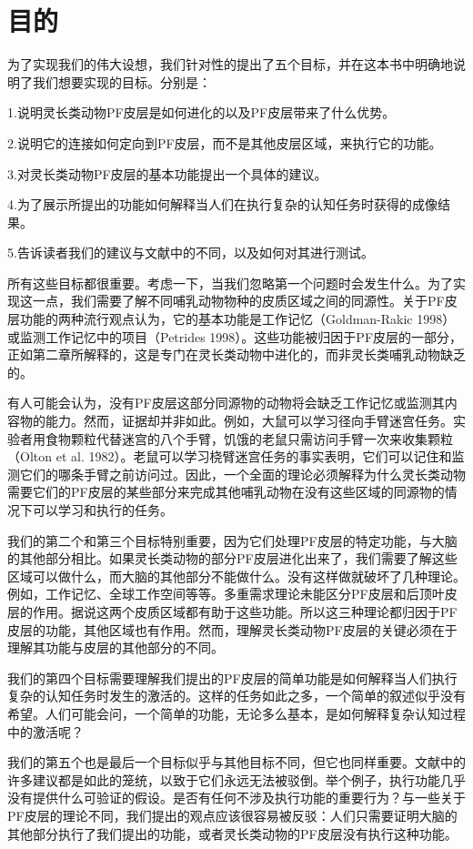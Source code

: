 \section{目的}
为了实现我们的伟大设想，我们针对性的提出了五个目标，并在这本书中明确地说明了我们想要实现的目标。分别是：
\par 
  1.说明灵长类动物PF皮层是如何进化的以及PF皮层带来了什么优势。 
\par 2.说明它的连接如何定向到PF皮层，而不是其他皮层区域，来执行它的功能。 
\par 3.对灵长类动物PF皮层的基本功能提出一个具体的建议。
\par 4.为了展示所提出的功能如何解释当人们在执行复杂的认知任务时获得的成像结果。
\par  5.告诉读者我们的建议与文献中的不同，以及如何对其进行测试。
\par 
所有这些目标都很重要。考虑一下，当我们忽略第一个问题时会发生什么。为了实现这一点，我们需要了解不同哺乳动物物种的皮质区域之间的同源性。关于PF皮层功能的两种流行观点认为，它的基本功能是工作记忆（Goldman-Rakic 1998）或监测工作记忆中的项目（Petrides 1998）。这些功能被归因于PF皮层的一部分，正如第二章所解释的，这是专门在灵长类动物中进化的，而非灵长类哺乳动物缺乏的。
\par 
有人可能会认为，没有PF皮层这部分同源物的动物将会缺乏工作记忆或监测其内容物的能力。然而，证据却并非如此。例如，大鼠可以学习径向手臂迷宫任务。实验者用食物颗粒代替迷宫的八个手臂，饥饿的老鼠只需访问手臂一次来收集颗粒（Olton et al. 1982）。老鼠可以学习桡臂迷宫任务的事实表明，它们可以记住和监测它们的哪条手臂之前访问过。因此，一个全面的理论必须解释为什么灵长类动物需要它们的PF皮层的某些部分来完成其他哺乳动物在没有这些区域的同源物的情况下可以学习和执行的任务。
\par
我们的第二个和第三个目标特别重要，因为它们处理PF皮层的特定功能，与大脑的其他部分相比。如果灵长类动物的部分PF皮层进化出来了，我们需要了解这些区域可以做什么，而大脑的其他部分不能做什么。没有这样做就破坏了几种理论。例如，工作记忆、全球工作空间等等。多重需求理论未能区分PF皮层和后顶叶皮层的作用。据说这两个皮质区域都有助于这些功能。所以这三种理论都归因于PF皮层的功能，其他区域也有作用。然而，理解灵长类动物PF皮层的关键必须在于理解其功能与皮层的其他部分的不同。
\par
我们的第四个目标需要理解我们提出的PF皮层的简单功能是如何解释当人们执行复杂的认知任务时发生的激活的。这样的任务如此之多，一个简单的叙述似乎没有希望。人们可能会问，一个简单的功能，无论多么基本，是如何解释复杂认知过程中的激活呢？
\par
我们的第五个也是最后一个目标似乎与其他目标不同，但它也同样重要。文献中的许多建议都是如此的笼统，以致于它们永远无法被驳倒。举个例子，执行功能几乎没有提供什么可验证的假设。是否有任何不涉及执行功能的重要行为？与一些关于PF皮层的理论不同，我们提出的观点应该很容易被反驳：人们只需要证明大脑的其他部分执行了我们提出的功能，或者灵长类动物的PF皮层没有执行这种功能。
